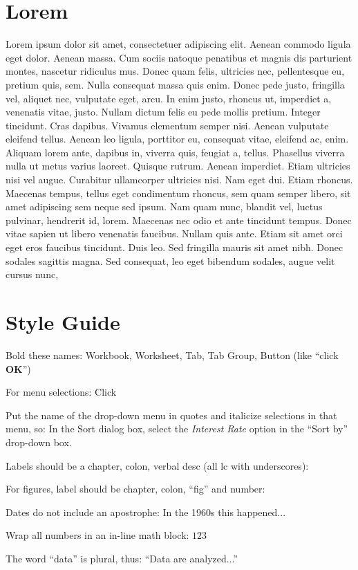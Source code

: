 \section{Lorem}
Lorem ipsum dolor sit amet, consectetuer adipiscing elit. Aenean commodo ligula eget dolor. Aenean massa. Cum sociis natoque penatibus et magnis dis parturient montes, nascetur ridiculus mus. Donec quam felis, ultricies nec, pellentesque eu, pretium quis, sem. Nulla consequat massa quis enim. Donec pede justo, fringilla vel, aliquet nec, vulputate eget, arcu. In enim justo, rhoncus ut, imperdiet a, venenatis vitae, justo. Nullam dictum felis eu pede mollis pretium. Integer tincidunt. Cras dapibus. Vivamus elementum semper nisi. Aenean vulputate eleifend tellus. Aenean leo ligula, porttitor eu, consequat vitae, eleifend ac, enim. Aliquam lorem ante, dapibus in, viverra quis, feugiat a, tellus. Phasellus viverra nulla ut metus varius laoreet. Quisque rutrum. Aenean imperdiet. Etiam ultricies nisi vel augue. Curabitur ullamcorper ultricies nisi. Nam eget dui. Etiam rhoncus. Maecenas tempus, tellus eget condimentum rhoncus, sem quam semper libero, sit amet adipiscing sem neque sed ipsum. Nam quam nunc, blandit vel, luctus pulvinar, hendrerit id, lorem. Maecenas nec odio et ante tincidunt tempus. Donec vitae sapien ut libero venenatis faucibus. Nullam quis ante. Etiam sit amet orci eget eros faucibus tincidunt. Duis leo. Sed fringilla mauris sit amet nibh. Donec sodales sagittis magna. Sed consequat, leo eget bibendum sodales, augue velit cursus nunc,

\section{Style Guide}

Bold these names: Workbook, Worksheet, Tab, Tab Group, Button (like ``click \textbf{OK}'') 

For menu selections: Click \textsc{}

Put the name of the drop-down menu in quotes and italicize selections in that menu, so: In the Sort dialog box, select the \textit{Interest Rate} option in the ``Sort by'' drop-down box.

Labels should be a chapter, colon, verbal desc (all lc with underscores): \label{03:title}

For figures, label should be chapter, colon, ``fig'' and number: \label{03:fig01}

Dates do not include an apostrophe: In the 1960s this happened...

Wrap all numbers in an in-line math block: $ 123 $

The word ``data'' is plural, thus: ``Data are analyzed...''

